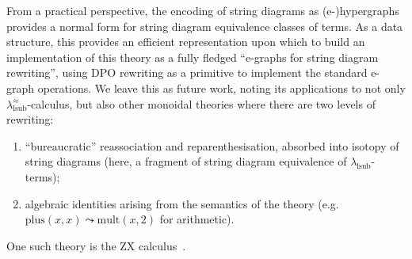 From a practical perspective, the encoding of string diagrams as (e-)hypergraphs provides a normal form for string diagram equivalence classes of terms.
As a data structure, this provides an efficient representation upon which to build an implementation of this theory as a fully fledged \enquote{e-graphs for string diagram rewriting}, using DPO rewriting as a primitive to implement the standard e-graph operations.
We leave this as future work, noting its applications to not only $\lambda^\approx_{\text{lsub}}$-calculus, but also other monoidal theories where there are two levels of rewriting:
\begin{enumerate}
	\item \enquote{bureaucratic} reassociation and reparenthesisation, absorbed into isotopy of string diagrams (here, a fragment of string diagram equivalence of $\lambda_{\text{lsub}}$-terms);
	\item algebraic identities arising from the semantics of the theory (e.g. ${\text{plus} (x, x) \leadsto \text{mult} (x, 2)}$ for arithmetic).
\end{enumerate}
One such theory is the ZX calculus~\cite{coeckeInteractingQuantumObservables2011}.

